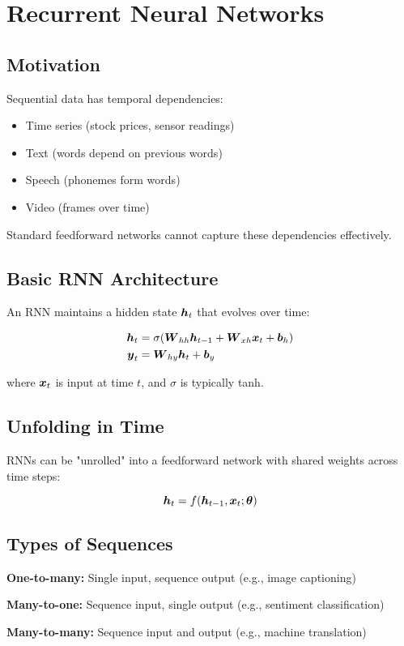 
\section{Recurrent Neural Networks}
\label{sec:rnns}

\subsection{Motivation}

Sequential data has temporal dependencies:
\begin{itemize}
    \item Time series (stock prices, sensor readings)
    \item Text (words depend on previous words)
    \item Speech (phonemes form words)
    \item Video (frames over time)
\end{itemize}

Standard feedforward networks cannot capture these dependencies effectively.

\subsection{Basic RNN Architecture}

An RNN maintains a hidden state $\boldsymbol{h}_t$ that evolves over time:

\begin{align}
\boldsymbol{h}_t &= \sigma(\boldsymbol{W}_{hh} \boldsymbol{h}_{t-1} + \boldsymbol{W}_{xh} \boldsymbol{x}_t + \boldsymbol{b}_h) \\
\boldsymbol{y}_t &= \boldsymbol{W}_{hy} \boldsymbol{h}_t + \boldsymbol{b}_y
\end{align}

where $\boldsymbol{x}_t$ is input at time $t$, and $\sigma$ is typically tanh.

\subsection{Unfolding in Time}

RNNs can be "unrolled" into a feedforward network with shared weights across time steps:

\begin{equation}
\boldsymbol{h}_t = f(\boldsymbol{h}_{t-1}, \boldsymbol{x}_t; \boldsymbol{\theta})
\end{equation}

\subsection{Types of Sequences}

\textbf{One-to-many:} Single input, sequence output (e.g., image captioning)

\textbf{Many-to-one:} Sequence input, single output (e.g., sentiment classification)

\textbf{Many-to-many:} Sequence input and output (e.g., machine translation)

